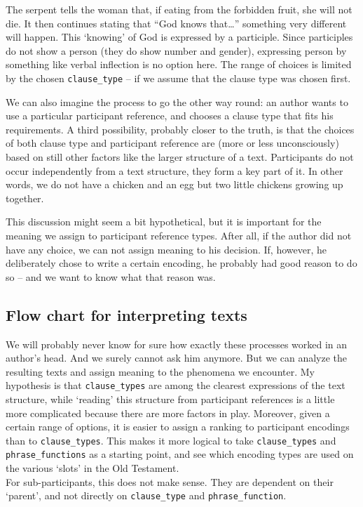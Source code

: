 \documentclass{report}
\newcommand{\mi}[1]{\lstinline{#1}}
\begin{document}
The serpent tells the woman that, if eating from the forbidden fruit, she will not die. It then continues stating that ``God knows that\ldots'' something very different will happen. This `knowing' of God is expressed by a participle. Since participles do not show a person (they do show number and gender), expressing person by something like verbal inflection is no option here. The range of choices is limited by the chosen \mi{clause_type} -- if we assume that the clause type was chosen first.

We can also imagine the process to go the other way round: an author wants to use a particular participant reference, and chooses a clause type that fits his requirements.
A third possibility, probably closer to the truth, is that the choices of both clause type and participant reference are (more or less unconsciously) based on still other factors like the larger structure of a text. Participants do not occur independently from a text structure, they form a key part of it. In other words, we do not have a chicken and an egg but two little chickens growing up together.

This discussion might seem a bit hypothetical, but it is important for the meaning we assign to participant reference types. After all, if the author did not have any choice, we can not assign meaning to his decision. If, however, he deliberately chose to write a certain encoding, he probably had good reason to do so -- and we want to know what that reason was.

\subsection{Flow chart for interpreting texts}
We will probably never know for sure how exactly these processes worked in an author's head. And we surely cannot ask him anymore. But we can analyze the resulting texts and assign meaning to the phenomena we encounter. My hypothesis is that \mi{clause_types} are among the clearest expressions of the text structure, while `reading' this structure from participant references is a little more complicated because there are more factors in play. Moreover, given a certain range of options, it is easier to assign a ranking to participant encodings than to \mi{clause_types}. This makes it more logical to take \mi{clause_types} and \mi{phrase_functions} as a starting point, and see which encoding types are used on the various `slots' in the Old Testament.\\
For sub-participants, this does not make sense. They are dependent on their `parent', and not directly on \mi{clause_type} and \mi{phrase_function}.
\end{document}
